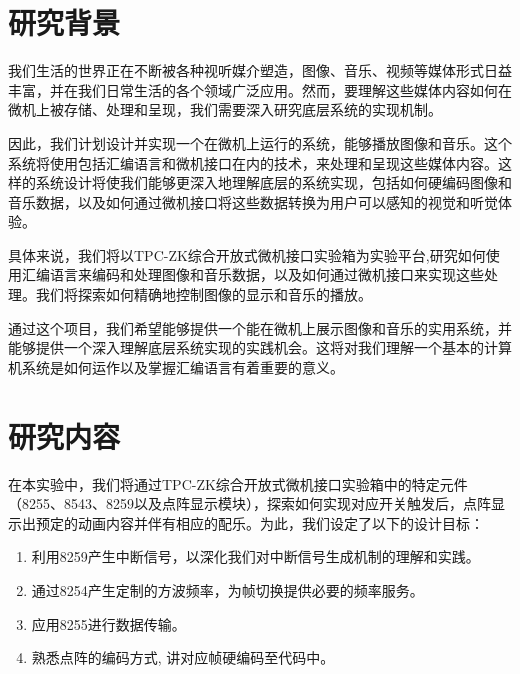 \documentclass{bjtu-bachelor-thesis}
\begin{document}
\cover %

\setcounter{page}{1}
\pagestyle{myfancy}

\tableofcontents
{}%
\pagestyle{myfancy}
\clearpage
%

\setcounter{page}{1}
\chapter{研究背景}

我们生活的世界正在不断被各种视听媒介塑造，图像、音乐、视频等媒体形式日益丰富，并在我们日常生活的各个领域广泛应用。然而，要理解这些媒体内容如何在微机上被存储、处理和呈现，我们需要深入研究底层系统的实现机制。

因此，我们计划设计并实现一个在微机上运行的系统，能够播放图像和音乐。这个系统将使用包括汇编语言和微机接口在内的技术，来处理和呈现这些媒体内容。这样的系统设计将使我们能够更深入地理解底层的系统实现，包括如何硬编码图像和音乐数据，以及如何通过微机接口将这些数据转换为用户可以感知的视觉和听觉体验。

具体来说，我们将以TPC-ZK综合开放式微机接口实验箱为实验平台,研究如何使用汇编语言来编码和处理图像和音乐数据，以及如何通过微机接口来实现这些处理。我们将探索如何精确地控制图像的显示和音乐的播放。

通过这个项目，我们希望能够提供一个能在微机上展示图像和音乐的实用系统，并能够提供一个深入理解底层系统实现的实践机会。这将对我们理解一个基本的计算机系统是如何运作以及掌握汇编语言有着重要的意义。

\chapter{研究内容}

在本实验中，我们将通过TPC-ZK综合开放式微机接口实验箱中的特定元件（8255、8543、8259以及点阵显示模块），探索如何实现对应开关触发后，点阵显示出预定的动画内容并伴有相应的配乐。为此，我们设定了以下的设计目标：
    \begin{enumerate}
        \item 利用8259产生中断信号，以深化我们对中断信号生成机制的理解和实践。
        \item 通过8254产生定制的方波频率，为帧切换提供必要的频率服务。
        \item 应用8255进行数据传输。
        \item 熟悉点阵的编码方式, 讲对应帧硬编码至代码中。
    \end{enumerate}
\vspace{0.5cm}
\end{document}
